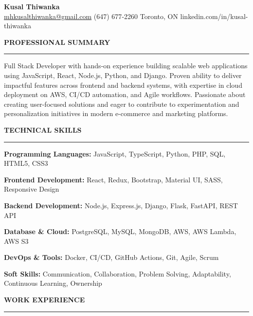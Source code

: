 \documentclass[10pt,letterpaper]{article}
\begin{document}
\begin{center}
{\LARGE\textbf{Kusal Thiwanka}}\\[3pt]
\href{mailto:mhkusalthiwanka@gmail.com}{mhkusalthiwanka@gmail.com}\hspace{2em}%
(647) 677{-}2260\hspace{2em}%
Toronto, ON\hspace{2em}
linkedin.com/in/kusal-thiwanka
\end{center}

\vspace{6pt}

\textbf{PROFESSIONAL SUMMARY}\\[-8pt]
\noindent\rule{\textwidth}{1pt}

\vspace{-2pt}

Full Stack Developer with hands-on experience building scalable web applications using JavaScript, React, Node.js, Python, and Django. Proven ability to deliver impactful features across frontend and backend systems, with expertise in cloud deployment on AWS, CI/CD automation, and Agile workflows. Passionate about creating user-focused solutions and eager to contribute to experimentation and personalization initiatives in modern e-commerce and marketing platforms.

\vspace{8pt}

\textbf{TECHNICAL SKILLS}\\[-8pt]
\noindent\rule{\textwidth}{1pt}

\vspace{-2pt}

\textbf{Programming Languages:} JavaScript, TypeScript, Python, PHP, SQL, HTML5, CSS3

\textbf{Frontend Development:} React, Redux, Bootstrap, Material UI, SASS, Responsive Design

\textbf{Backend Development:} Node.js, Express.js, Django, Flask, FastAPI, REST API

\textbf{Database \& Cloud:} PostgreSQL, MySQL, MongoDB, AWS, AWS Lambda, AWS S3

\textbf{DevOps \& Tools:} Docker, CI/CD, GitHub Actions, Git, Agile, Scrum

\textbf{Soft Skills:} Communication, Collaboration, Problem Solving, Adaptability, Continuous Learning, Ownership

\vspace{8pt}

\textbf{WORK EXPERIENCE}\\[-8pt]
\noindent\rule{\textwidth}{1pt}
\end{document}
